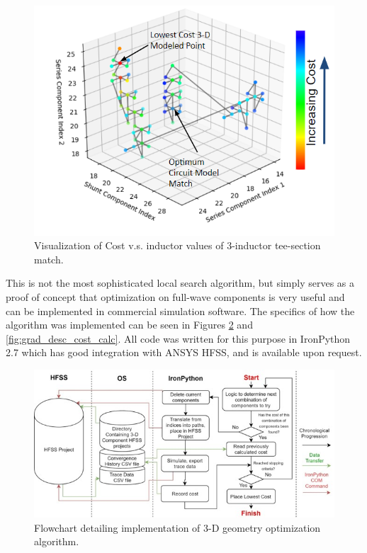 \documentclass[12pt]{usfcoe}
\begin{document}
    \begin{figure}[H]
		\begin{center}
        	\includegraphics[width=\textwidth]{images/gradient_descent/grad_descent_visual.PNG} 
            \caption{Visualization of Cost v.s. inductor values of 3-inductor tee-section match.}
            \label{fig:ant_mn_cost_visual}
		\end{center}
	\end{figure}
	
    This is not the most sophisticated local search algorithm, but simply serves as a proof of concept that optimization on full-wave components is very useful and can be implemented in commercial simulation software.
    The specifics of how the algorithm was implemented can be seen in Figures \ref{fig:grad_desc_implementation} and \ref{fig:grad_desc_cost_calc}.
    All code was written for this purpose in IronPython 2.7 which has good integration with ANSYS HFSS, and is available upon request. 

    \begin{figure}[H]
		\begin{center}
        	\includegraphics[width=\textwidth]{images/gradient_descent/flowchart.png} 
            \caption{Flowchart detailing implementation of 3-D geometry optimization algorithm.}
            \label{fig:grad_desc_implementation}
		\end{center}
	\end{figure}
	
\end{document}
